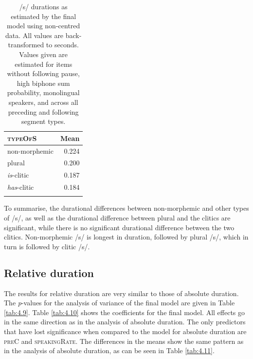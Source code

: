 \begin{table}\fontsize{10}{11}
\caption{/s/ durations as estimated by the final model using non-centred data. All values are back-transformed to seconds. Values given are estimated for items without following pause, high biphone sum probability, monolingual speakers, and across all preceding and following segment types.}
\label{tab:4.8}
\begin{tabular}{lr} 
\lsptoprule
\textsc{typeOfS}                      & Mean   \\ 
\midrule
non-morphemic                & 0.224  \\
plural                       & 0.200  \\
\textit{is}-clitic           & 0.187  \\
\textit{has}-clitic          & 0.184  \\
\lspbottomrule
\end{tabular}
\end{table}

To summarise, the durational differences between non-morphemic and other types of /s/, as well as the durational difference between plural and the clitics are significant, while there is no significant durational difference between the two clitics. Non-morphemic /s/ is longest in duration, followed by plural /s/, which in turn is followed by clitic /s/.

\subsection{Relative duration}\label{section04_3_2}

The results for relative duration are very similar to those of absolute duration. The \textit{p}-values for the analysis of variance of the final model are given in Table \ref{tab:4.9}. Table \ref{tab:4.10} shows the coefficients for the final model. All effects go in the same direction as in the analysis of absolute duration. The only predictors that have lost significance when compared to the model for absolute duration are \textsc{preC} and \textsc{speakingRate}. The differences in the means show the same pattern as in the analysis of absolute duration, as can be seen in Table \ref{tab:4.11}.

